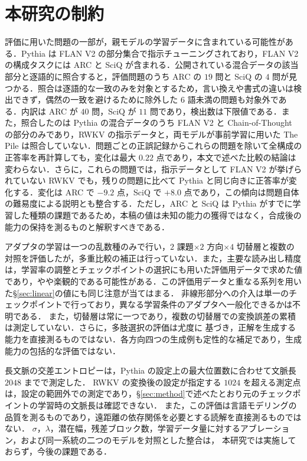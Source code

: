 \documentclass[techrep,noauthor]{ipsj}
\begin{document}
\section{本研究の制約}\label{sec:limitations}
評価に用いた問題の一部が，親モデルの学習データに含まれている可能性がある．Pythia は FLAN V2 の部分集合で指示チューニングされており，FLAN V2 の構成タスクには ARC と SciQ が含まれる．公開されている混合データの該当部分と逐語的に照合すると，評価問題のうち ARC の $19$ 問と SciQ の $4$ 問が見つかる．照合は逐語的な一致のみを対象とするため，言い換えや書式の違いは検出できず，偶然の一致を避けるために除外した $6$ 語未満の問題も対象外である．内訳は ARC が $40$ 問，SciQ が $11$ 問であり，検出数は下限値である．また，照合したのは Pythia の混合データのうち FLAN V2 と Chain-of-Thought の部分のみであり，RWKV の指示データと，両モデルが事前学習に用いた The Pile は照合していない．問題ごとの正誤記録からこれらの問題を除いて全構成の正答率を再計算しても，変化は最大 $0.22$ 点であり，本文で述べた比較の結論は変わらない．さらに，これらの問題では，指示データとして FLAN V2 が挙げられていない RWKV でも，残りの問題に比べて Pythia と同じ向きに正答率が変化する．変化は ARC で $-9.2$ 点，SciQ で $+8.0$ 点であり，この傾向は問題自体の難易度による説明とも整合する．ただし，ARC と SciQ は Pythia がすでに学習した種類の課題であるため，本稿の値は未知の能力の獲得ではなく，合成後の能力の保持を測るものと解釈すべきである．

アダプタの学習は一つの乱数種のみで行い，$2$ 課題$\times2$ 方向$\times4$ 切替層と複数の対照を評価したが，多重比較の補正は行っていない．また，主要な読み出し精度は，学習率の調整とチェックポイントの選択にも用いた評価用データで求めた値であり，やや楽観的である可能性がある．この評価用データと重なる系列を用いた\S\ref{sec:linear}の値にも同じ注意が当てはまる．
非線形部分への介入は単一のチェックポイントで行っており，異なる学習条件のアダプタへ一般化できるかは不明である．
また，切替層は常に一つであり，複数の切替層での変換誤差の累積は測定していない．さらに，多肢選択の評価は尤度に
基づき，正解を生成する能力を直接測るものではない．各方向四つの生成例も定性的な補足であり，生成能力の包括的な評価ではない．

長文脈の交差エントロピーは，Pythia の設定上の最大位置数に合わせて文脈長 $2048$ までで測定した．
RWKV の変換後の設定が指定する $1024$ を超える測定点は，設定の範囲外での測定であり，\S\ref{sec:method}で述べたとおり元のチェックポイントの学習時の文脈長は確認できない．
また，この評価は言語モデリングの品質を測るものであり，遠距離の依存関係を必要とする読解を直接測るものではない．
$\sigma$，$\lambda$，潜在幅，残差ブロック数，学習データ量に対するアブレーション，および同一系統の二つのモデルを対照とした整合は，
本研究では実施しておらず，今後の課題である．
\end{document}
